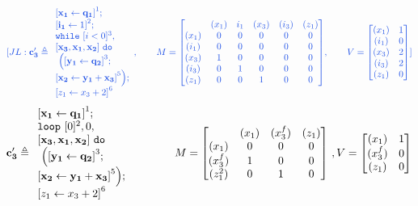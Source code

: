 \documentclass[a4paper,11pt]{article}
\begin{document}
\[
\jl{\ssa{c_3'} \triangleq
\begin{array}{l}
     \left[\ssa{ x_1 \leftarrow q_1}  \right]^1 ; \\
     \left[\ssa{i_1} \leftarrow 1 \right]^2 ; \\
    \ewhile ~ [i < 0]^{3} ,\\
  \ssa{[x_3 , x_1 , x_2]} 
     ~ \edo
    \\
    ~ \Big( 
    \left[\ssa{ y_1 \leftarrow q_2} \right]^3; \\
    \left[\ssa{x_2 \leftarrow y_1  + x_3 } \right]^5
    \Big) ; \\
    \left[ \assign{z_1}{x_3 + 2}  \right]^{6}
\end{array},
~~~~~~
M =  \left[ \begin{matrix}
 & (x_1) & i_1 & (x_3) & (i_3) & (z_1)  \\
(x_1) & 0 & 0 & 0 & 0 & 0 \\
(i_1) & 0 & 0 & 0 & 0 & 0 \\
(x_3) & 1 & 0 & 0 & 0 & 0 \\
(i_3) & 0 & 1 & 0 & 0 & 0 \\
(z_1) & 0 & 0 & 1 & 0 & 0 \\
\end{matrix} \right],
~~~~~~
V = \left [ \begin{matrix}
(x_1)  & 1 \\
(i_1)  & 0 \\
(x_3)  & 2 \\
(i_3)  & 2 \\
(z_1)  & 0 \\
\end{matrix} \right ]
}
\]
%
\[\ssa{c_3'} \triangleq
\begin{array}{l}
     \left[\ssa{ x_1 \leftarrow q_1}  \right]^1 ; \\
    \eloop ~ [0]^{2} , 0,\\
  \ssa{[x_3 , x_1 , x_2]} 
     ~ \edo
    \\
    ~ \Big( 
    \left[\ssa{ y_1 \leftarrow q_2} \right]^3; \\
    \left[\ssa{x_2 \leftarrow y_1  + x_3 } \right]^5
    \Big) ; \\
    \left[ \assign{z_1}{x_3 + 2}  \right]^{6}
\end{array}
~~~~~~~~~~~~
M =  \left[ \begin{matrix}
 & (x_1) & (x_3^{f}) & (z_1)  \\
(x_1) & 0 & 0 & 0 \\
(x_3^{f}) & 1 & 0 & 0 \\
(z_1^{2}) & 0 & 1 & 0 \\
\end{matrix} \right] ~ , V = \left [ \begin{matrix}
(x_1) &  1 \\
(x_3^{f}) & 0 \\
(z_1) &  0 \\
\end{matrix} \right ]
\]
\end{document}
